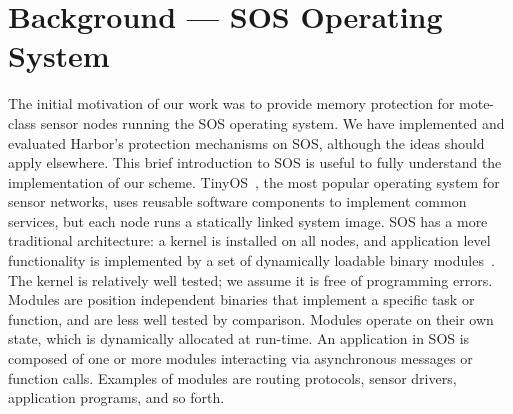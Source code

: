 \section{Background --- SOS Operating System}
\label{sec:background}
% 
The initial motivation of our work was to provide memory protection
for mote-class sensor nodes running the SOS operating system.
% 
% 
We have implemented and evaluated Harbor's protection mechanisms on
SOS, although the ideas should apply elsewhere.
% 
This brief introduction to SOS is useful to fully understand the
implementation of our scheme.
% 
% 
% 
TinyOS~\cite{levis05t2}, the most popular operating system for sensor
networks, uses reusable software components to implement common
services, but each node runs a statically linked system image.
% 
% 
% 
SOS has a more traditional architecture: a kernel is
installed on all nodes, and
% 
application level functionality is implemented by a set of dynamically
loadable binary modules~\cite{ram05sos}.
% 
% 
% 
% 
% 
% 
% 
% 
% 
The kernel is relatively well tested; we assume it is free of
programming errors.
% 
Modules are position independent binaries that implement a specific
task or function, and are less well tested by comparison.
% 
Modules operate on their own state, which is dynamically allocated at
run-time.
% 
An application in SOS is composed of one or more modules interacting
via asynchronous messages or function calls.
% 
Examples of modules are routing protocols, sensor drivers, application
programs, and so forth.
%
